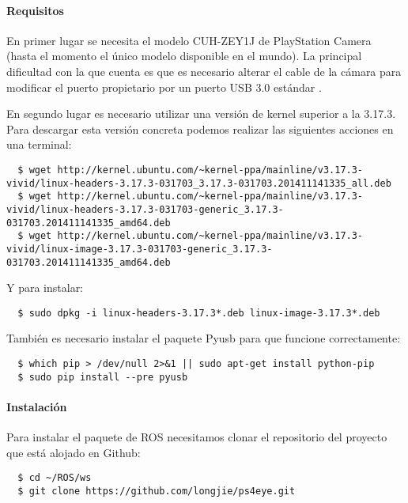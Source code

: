\paragraph{Requisitos} \hspace{0pt}

En primer lugar se necesita el modelo CUH-ZEY1J de PlayStation Camera (hasta el
momento el único modelo disponible en el mundo). La principal dificultad con la
que cuenta es que es necesario alterar el cable de la cámara para modificar el
puerto propietario por un puerto USB 3.0 estándar \cite{PS4EyeHack}.

En segundo lugar es necesario utilizar una versión de kernel superior a la
3.17.3. Para descargar esta versión concreta podemos realizar las siguientes
acciones en una terminal:
\\
\begin{lstlisting}
  $ wget http://kernel.ubuntu.com/~kernel-ppa/mainline/v3.17.3-vivid/linux-headers-3.17.3-031703_3.17.3-031703.201411141335_all.deb
  $ wget http://kernel.ubuntu.com/~kernel-ppa/mainline/v3.17.3-vivid/linux-headers-3.17.3-031703-generic_3.17.3-031703.201411141335_amd64.deb
  $ wget http://kernel.ubuntu.com/~kernel-ppa/mainline/v3.17.3-vivid/linux-image-3.17.3-031703-generic_3.17.3-031703.201411141335_amd64.deb
\end{lstlisting}

Y para instalar:
\\
\begin{lstlisting}
  $ sudo dpkg -i linux-headers-3.17.3*.deb linux-image-3.17.3*.deb
\end{lstlisting}

También es necesario instalar el paquete Pyusb para que funcione correctamente:
\\
\begin{lstlisting}
  $ which pip > /dev/null 2>&1 || sudo apt-get install python-pip
  $ sudo pip install --pre pyusb
\end{lstlisting}

\paragraph{Instalación} \hspace{0pt}

Para instalar el paquete de ROS necesitamos clonar el repositorio del proyecto
que está alojado en Github:
\\
\begin{lstlisting}
  $ cd ~/ROS/ws
  $ git clone https://github.com/longjie/ps4eye.git
\end{lstlisting}

